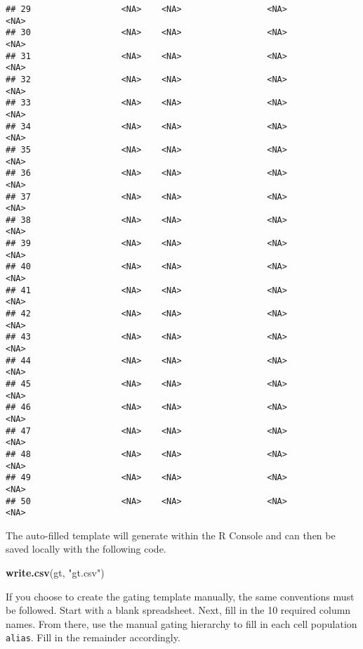 \documentclass[]{book}
\newenvironment{Shaded}{\begin{snugshade}}{\end{snugshade}}
\newcommand{\KeywordTok}[1]{\textcolor[rgb]{0.13,0.29,0.53}{\textbf{#1}}}
\newcommand{\NormalTok}[1]{#1}
\newcommand{\StringTok}[1]{\textcolor[rgb]{0.31,0.60,0.02}{#1}}
\begin{document}
\begin{verbatim}
## 29                  <NA>    <NA>                 <NA>               <NA>
## 30                  <NA>    <NA>                 <NA>               <NA>
## 31                  <NA>    <NA>                 <NA>               <NA>
## 32                  <NA>    <NA>                 <NA>               <NA>
## 33                  <NA>    <NA>                 <NA>               <NA>
## 34                  <NA>    <NA>                 <NA>               <NA>
## 35                  <NA>    <NA>                 <NA>               <NA>
## 36                  <NA>    <NA>                 <NA>               <NA>
## 37                  <NA>    <NA>                 <NA>               <NA>
## 38                  <NA>    <NA>                 <NA>               <NA>
## 39                  <NA>    <NA>                 <NA>               <NA>
## 40                  <NA>    <NA>                 <NA>               <NA>
## 41                  <NA>    <NA>                 <NA>               <NA>
## 42                  <NA>    <NA>                 <NA>               <NA>
## 43                  <NA>    <NA>                 <NA>               <NA>
## 44                  <NA>    <NA>                 <NA>               <NA>
## 45                  <NA>    <NA>                 <NA>               <NA>
## 46                  <NA>    <NA>                 <NA>               <NA>
## 47                  <NA>    <NA>                 <NA>               <NA>
## 48                  <NA>    <NA>                 <NA>               <NA>
## 49                  <NA>    <NA>                 <NA>               <NA>
## 50                  <NA>    <NA>                 <NA>               <NA>
\end{verbatim}

The auto-filled template will generate within the R Console and can then be saved locally with the following code.

\begin{Shaded}
\begin{Highlighting}[]
\KeywordTok{write.csv}\NormalTok{(gt, }\StringTok{"gt.csv"}\NormalTok{)}
\end{Highlighting}
\end{Shaded}

If you choose to create the gating template manually, the same conventions must be followed. Start with a blank spreadsheet. Next, fill in the 10 required column names. From there, use the manual gating hierarchy to fill in each cell population \texttt{alias}. Fill in the remainder accordingly.
\end{document}
